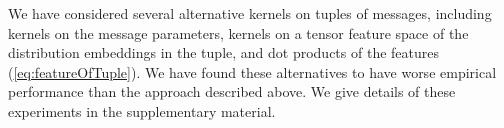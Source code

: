 \documentclass[english]{article}
\theoremstyle{plain}
\theoremstyle{plain}
\begin{document}
We have considered several alternative kernels on tuples of messages, including kernels on the message parameters, kernels on a tensor feature space of the distribution embeddings in the tuple, and dot products of the features (\ref{eq:featureOfTuple}). We have found these alternatives to have worse empirical performance than the approach described above. We give details of these experiments in the
supplementary material.

%
%
%
%
%
\end{document}
